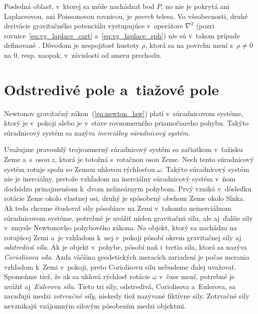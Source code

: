 \documentclass[a4paper, 12pt]{book}
\begin{document}
Posledná oblasť, v~ktorej sa môže nachádzať bod $P$, no nie je pokrytá ani
Laplaceovou, ani Poissonovou rovnicou, je \emph{povrch} telesa.  Vo
všeobecnosti, druhé derivácie gravitačného potenciálu vystupujúce v~operátore
$\nabla^2$ (pozri rovnice~\ref{eq:vg_laplace_cart} a~\ref{eq:vg_laplace_sph})
nie sú v~takom prípade definované \citep{Kellogg1967}.  Dôvodom je nespojitosť
hustoty $\rho$, ktorá sa na povrchu mení z~$\rho \neq 0$ na 0, resp. naopak,
v~závislosti od smeru prechodu.






\section{Odstredivé pole a~tiažové pole}
\label{sec:centrifugal_gravity_field}

Newtonov gravitačný zákon~(\ref{eq:newton_law}) platí v~súradnicovom systéme,
ktorý je v~pokoji alebo je v~stave rovnomerného priamočiareho pohybu.  Takýto
súradnicový systém sa nazýva \emph{inerciálny súradnicový systém}.

Uvažujme pravouhlý trojrozmerný súradnicový systém so začiatkom v~ťažisku Zeme
a~s~osou $z$, ktorá je totožná s~rotačnou osou Zeme.  Nech tento súradnicový
systém rotuje spolu so Zemou uhlovou rýchlosťou $\omega$.  Takýto súradnicový
systém nie je inerciálny, pretože vzhľadom na inerciálny súradnicový systém
v~ňom dochádza prinajmenšom k~dvom nelineárnym pohybom.  Prvý vzniká v~dôsledku
rotácie Zeme okolo vlastnej osi, druhý je spôsobený obehom Zeme okolo Slnka.
Ak teda chceme študovať sily pôsobiace na Zemi v~takomto neinerciálnom
súradnicovom systéme, potrebné je uvážiť nielen gravitačnú silu, ale aj~ďalšie
sily v~zmysle Newtonovho pohybového zákona.  Na objekt, ktorý sa nachádza na
rotujúcej Zemi a~je vzhľadom k~nej v~pokoji pôsobí okrem gravitačnej sily aj
\emph{odstredivá sila}.  Ak je objekt v~pohybe, pôsobí naň i~tretia sila, ktorá
sa nazýva \emph{Coriolisova sila}.  Azda väčšina geodetických meracích
zariadení je počas merania vzhľadom k~Zemi v~pokoji, preto Coriolisovu silu
nebudeme ďalej uvažovať.  Spomeňme tiež, že ak sa uhlová rýchlosť rotácie
$\omega$ v~čase mení, potrebné je uvážiť aj~\emph{Eulerovu silu}.  Tieto tri
sily, odstredivá, Coriolisova a~Eulerova, sa zaraďujú medzi \emph{zotrvačné
sily}, niekedy tiež nazývané fiktívne sily.  Zotrvačné sily nevznikajú
vzájomným silovým pôsobením medzi objektmi.
\end{document}
